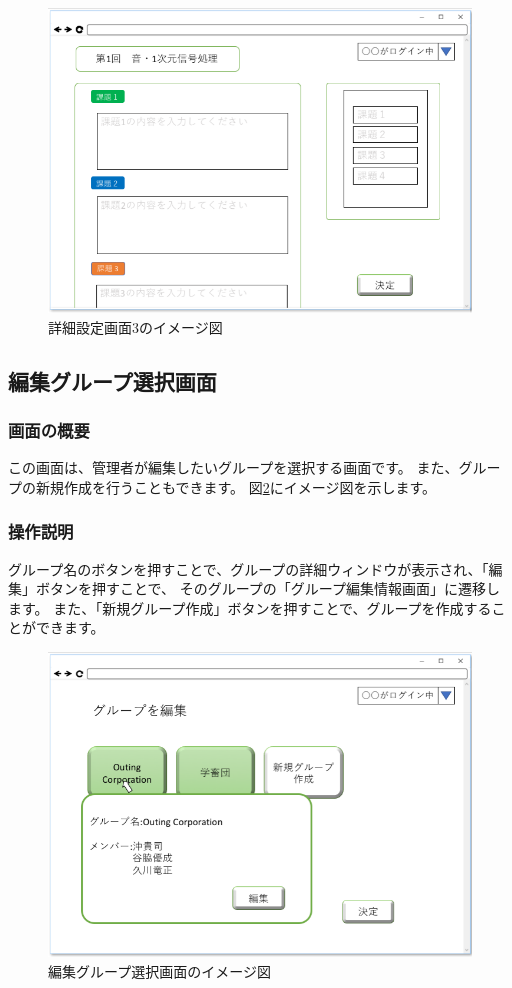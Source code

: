 \begin{figure}[htbp]
  \begin{center}
    \includegraphics[width=0.8\linewidth,clip]{./img/13.png}
    \caption{詳細設定画面3のイメージ図}\label{fig:13}
  \end{center}
\end{figure}

\newpage

\subsection{編集グループ選択画面}
\subsubsection{画面の概要}
この画面は、管理者が編集したいグループを選択する画面です。
また、グループの新規作成を行うこともできます。
図\ref{fig:14}にイメージ図を示します。

\subsubsection{操作説明}
グループ名のボタンを押すことで、グループの詳細ウィンドウが表示され、「編集」ボタンを押すことで、
そのグループの「グループ編集情報画面」に遷移します。
また、「新規グループ作成」ボタンを押すことで、グループを作成することができます。

\begin{figure}[htbp]
  \begin{center}
    \includegraphics[width=0.8\linewidth,clip]{./img/14.png}
    \caption{編集グループ選択画面のイメージ図}\label{fig:14}
  \end{center}
\end{figure}

